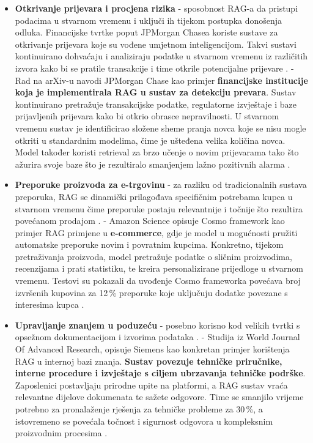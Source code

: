 \documentclass[]{foi}
\begin{document}
\begin{itemize}
    \item \textbf{Otkrivanje prijevara i procjena rizika} - sposobnost RAG-a da pristupi podacima u stvarnom vremenu i uključi ih tijekom postupka donošenja odluka.
    Financijske tvrtke poput JPMorgan Chasea koriste sustave za otkrivanje prijevara koje su vođene umjetnom inteligencijom. Takvi sustavi kontinuirano dohvaćaju i analiziraju podatke
    u stvarnom vremenu iz različitih izvora kako bi se pratile transakcije i time otkrile potencijalne prijevare \cite{nishtha2025rag}. 
    \subitem - Rad na arXiv-u navodi JPMorgan Chase kao primjer \textbf{financijske institucije koja je implementirala RAG u sustav za detekciju prevara}. Sustav kontinuirano pretražuje transakcijske
    podatke, regulatorne izvještaje i baze prijavljenih prijevara kako bi otkrio obrasce nepravilnosti. U stvarnom vremenu sustav je identificirao složene sheme pranja novca koje se 
    nisu mogle otkriti u standardnim modelima, čime je ušteđena velika količina novca. Model također koristi retrieval za brzo učenje o novim prijevarama tako što ažurira svoje baze što
    je rezultiralo smanjenjem lažno pozitivnih alarma \cite{Singh2025}.

    \item \textbf{Preporuke proizvoda za e-trgovinu} - za razliku od tradicionalnih sustava preporuka, RAG se dinamički prilagođava specifičnim potrebama kupca u stvarnom vremenu čime
    preporuke postaju relevantnije i točnije što rezultira povećanom prodajom \cite{nishtha2025rag}.
    \subitem - Amazon Science opisuje Cosmo framework kao primjer RAG primjene u \textbf{e-commerce}, gdje je model u mogućnosti pružiti automatske preporuke novim i povratnim kupcima.
    Konkretno, tijekom pretraživanja proizvoda, model pretražuje podatke o sličnim proizvodima, recenzijama i prati statistiku, te kreira personalizirane prijedloge u stvarnom vremenu.
    Testovi su pokazali da uvođenje Cosmo frameworka povećava broj izvršenih kupovina za 12\,\% preporuke koje uključuju dodatke povezane s interesima kupca \cite{Sun2025}.

    \item \textbf{Upravljanje znanjem u poduzeću} - posebno korisno kod velikih tvrtki s opsežnom dokumentacijom i izvorima podataka \cite{nishtha2025rag}. 
    \subitem - Studija iz World Journal Of Advanced Research, opisuje Siemens kao konkretan primjer korištenja RAG u internoj bazi znanja. \textbf{Sustav povezuje tehničke priručnike, interne procedure
    i izvještaje s ciljem ubrzavanja tehničke podrške}. Zaposlenici postavljaju prirodne upite na platformi, a RAG sustav vraća relevantne dijelove dokumenata te sažete odgovore. Time
    se smanjilo vrijeme potrebno za pronalaženje rješenja za tehničke probleme za 30\,\%, a istovremeno se povećala točnost i sigurnost odgovora u kompleksnim proizvodnim procesima \cite{Gadde2025}. 
\end{itemize}
\end{document}
